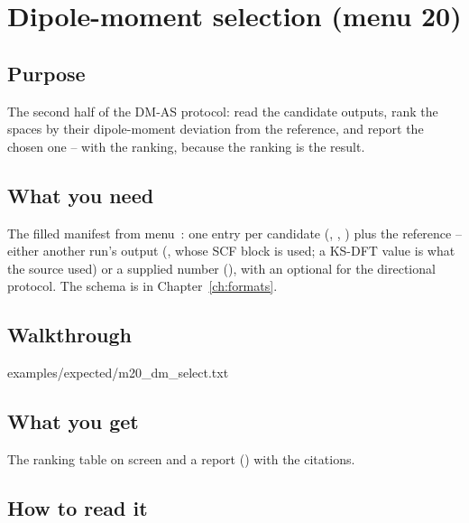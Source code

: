 \chapter{Dipole-moment selection (menu 20)}
\label{ch:menu20}

\section{Purpose}

The second half of the DM-AS protocol: read the candidate outputs, rank the
spaces by their dipole-moment deviation from the reference, and report the
chosen one -- with the ranking, because the ranking is the result.

\section{What you need}

The filled manifest from menu~: one entry per candidate
(, , ) plus the reference -- either another
run's output (, whose SCF block is used; a
KS-DFT value is what the source used) or a supplied number
(), with an
optional  for the directional protocol.  The schema is in
Chapter~\ref{ch:formats}.

\section{Walkthrough}


  {examples/expected/m20_dm_select.txt}

\section{What you get}

The ranking table on screen and a report
() with the citations.

\section{How to read it}

